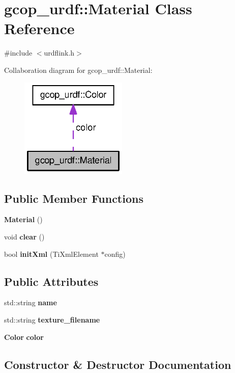 \section{gcop\-\_\-urdf\-:\-:\-Material \-Class \-Reference}
\label{classgcop__urdf_1_1Material}


{\ttfamily \#include $<$urdflink.\-h$>$}



\-Collaboration diagram for gcop\-\_\-urdf\-:\-:\-Material\-:
\nopagebreak
\begin{figure}[H]
\begin{center}
\leavevmode
\includegraphics[width=144pt]{classgcop__urdf_1_1Material__coll__graph}
\end{center}
\end{figure}
\subsection*{\-Public \-Member \-Functions}
\begin{DoxyCompactItemize}
\item 
{\bf \-Material} ()
\item 
void {\bf clear} ()
\item 
bool {\bf init\-Xml} (\-Ti\-Xml\-Element $\ast$config)
\end{DoxyCompactItemize}
\subsection*{\-Public \-Attributes}
\begin{DoxyCompactItemize}
\item 
std\-::string {\bf name}
\item 
std\-::string {\bf texture\-\_\-filename}
\item 
{\bf \-Color} {\bf color}
\end{DoxyCompactItemize}


\subsection{\-Constructor \& \-Destructor \-Documentation}
